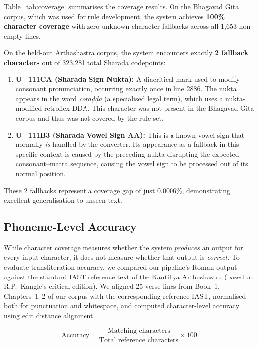 \documentclass[11pt]{article}
\begin{document}
Table~\ref{tab:coverage} summarises the coverage results. On the Bhagavad Gita corpus, which was used for rule development, the system achieves \textbf{100\% character coverage} with zero unknown-character fallbacks across all 1,653 non-empty lines.

On the held-out Arthashastra corpus, the system encounters exactly \textbf{2 fallback characters} out of 323,281 total Sharada codepoints:

\begin{enumerate}
    \item \textbf{U+111CA (Sharada Sign Nukta):} A diacritical mark used to modify consonant pronunciation, occurring exactly once in line 2886. The nukta appears in the word \textit{cora\d{d}\d{d}\={a}} (a specialised legal term), which uses a nukta-modified retroflex DDA. This character was not present in the Bhagavad Gita corpus and thus was not covered by the rule set.
    \item \textbf{U+111B3 (Sharada Vowel Sign AA):} This is a known vowel sign that normally \textit{is} handled by the converter. Its appearance as a fallback in this specific context is caused by the preceding nukta disrupting the expected consonant--matra sequence, causing the vowel sign to be processed out of its normal position.
\end{enumerate}

These 2 fallbacks represent a coverage gap of just 0.0006\%, demonstrating excellent generalisation to unseen text.

\subsection{Phoneme-Level Accuracy}

While character coverage measures whether the system \textit{produces} an output for every input character, it does not measure whether that output is \textit{correct}. To evaluate transliteration accuracy, we compared our pipeline's Roman output against the standard IAST reference text of the Kautiliya Arthashastra (based on R.P.\ Kangle's critical edition). We aligned 25 verse-lines from Book~1, Chapters~1--2 of our corpus with the corresponding reference IAST, normalised both for punctuation and whitespace, and computed character-level accuracy using edit distance alignment.

\[
\text{Accuracy} = \frac{\text{Matching characters}}{\text{Total reference characters}} \times 100
\]
\end{document}
